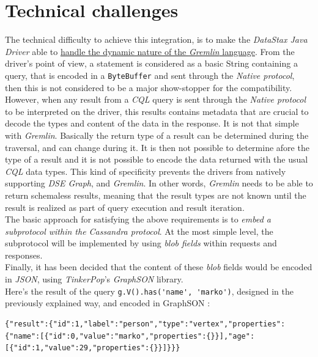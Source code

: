 \documentclass[a4paper]{report}
\newcommand{\djd}{\emph{DataStax Java Driver\xspace}}
\newcommand{\dseg}{\emph{DSE Graph\xspace}}
\newcommand{\tp}{\emph{TinkerPop\xspace}}
\begin{document}
\section{Technical challenges}
The technical difficulty to achieve this integration, is to make the \djd{} able to \underline{handle the dynamic nature of the \emph{Gremlin} language}. From the driver's point of view, a statement is considered as a basic String containing a query, that is encoded in a \verb;ByteBuffer; and sent through the \emph{Native protocol}, then this is not considered to be a major show-stopper for the compatibility. However, when any result from a \emph{CQL} query is sent through the \emph{Native protocol} to be interpreted on the driver, this results contains metadata that are crucial to decode the types and content of the data in the response. It is not that simple with \emph{Gremlin}. Basically the return type of a result can be determined during the traversal, and can change during it. It is then not possible to determine afore the type of a result and it is not possible to encode the data returned with the usual \emph{CQL} data types. This kind of specificity prevents the drivers from natively supporting \dseg{}, and \emph{Gremlin}. In other words, \emph{Gremlin} needs to be able to return schemaless results, meaning that the result types are not known until the result is realized as part of query execution and result iteration.\\
The basic approach for satisfying the above requirements is to \emph{embed a subprotocol within the Cassandra protocol}. At the most simple level, the subprotocol will be implemented by using \emph{blob fields} within requests and responses.\\
Finally, it has been decided that the content of these \emph{blob} fields would be encoded in \emph{JSON}, using \tp{}'s \emph{GraphSON} library.\\
Here's the result of the query \verb;g.V().has('name', 'marko');, designed in the previously explained way, and encoded in GraphSON : 
\begin{lstlisting}[label=dsegJava-ex-2, caption=The result of a Traversal returned in GraphSON, style=Java]
{"result":{"id":1,"label":"person","type":"vertex","properties":{"name":[{"id":0,"value":"marko","properties":{}}],"age":[{"id":1,"value":29,"properties":{}}]}}}
\end{lstlisting}
\end{document}
